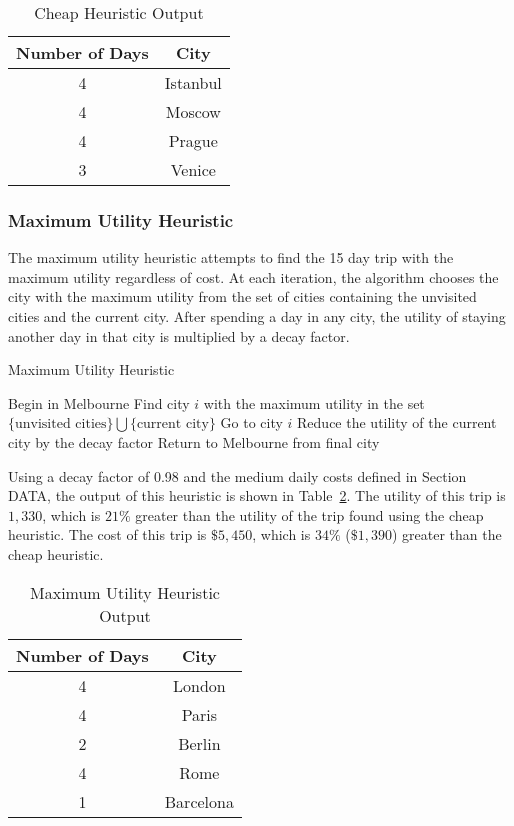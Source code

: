\documentclass[12pt]{article}
\begin{document}
\begin{table}[ht!]
	\centering
	\begin{tabular}{| c || c |}
		\hline
		Number of Days & City \\ \hline \hline
		4 & Istanbul \\ \hline
		4 & Moscow \\ \hline
		4 & Prague \\ \hline
		3 & Venice \\ \hline
	\end{tabular}
	\caption{Cheap Heuristic Output}
	\label{cheap_heuristic_output}
\end{table}

\subsubsection{Maximum Utility Heuristic}

The maximum utility heuristic attempts to find the 15 day trip with the maximum utility regardless of cost. At each iteration, the algorithm chooses the city with the maximum utility from the set of cities containing the unvisited cities and the current city. After spending a day in any city, the utility of staying another day in that city is multiplied by a decay factor.

\begin{algorithm}[ht!]
\caption{Maximum Utility Heuristic}
\begin{algorithmic}
\STATE Begin in Melbourne
\STATE Find city $i$ with the maximum utility in the set $\{ \text{unvisited cities} \} \bigcup \{ \text{current city} \}$
\STATE Go to city $i$
\STATE Reduce the utility of the current city by the decay factor
\ENDFOR
\STATE Return to Melbourne from final city
\end{algorithmic}
\end{algorithm}

Using a decay factor of 0.98 and the medium daily costs defined in Section DATA, the output of this heuristic is shown in Table~\ref{max_utility_heuristic_output}. The utility of this trip is $1,330$, which is $21\%$ greater than the utility of the trip found using the cheap heuristic. The cost of this trip is $\$5,450$, which is $34\%$ ($\$1,390$) greater than the cheap heuristic.

\begin{table}[ht!]
	\centering
	\begin{tabular}{| c || c |}
		\hline
		Number of Days & City \\ \hline \hline
		4 & London \\ \hline
		4 & Paris \\ \hline
		2 & Berlin \\ \hline
		4 & Rome \\ \hline
		1 & Barcelona \\ \hline
	\end{tabular}
	\caption{Maximum Utility Heuristic Output}
	\label{max_utility_heuristic_output}
\end{table}
 
\end{document}
